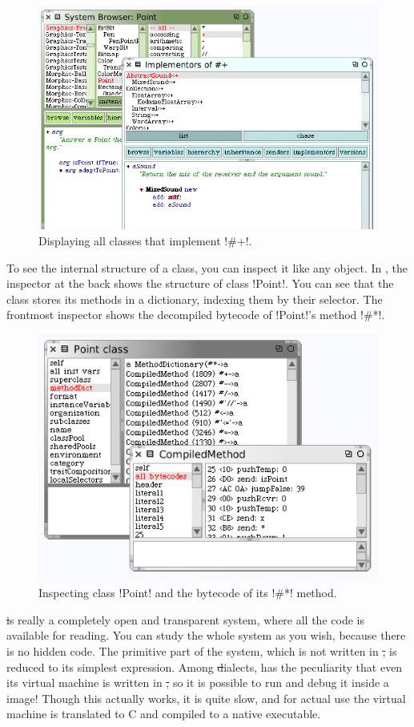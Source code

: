 \documentclass[a4paper,10pt,twoside]{book}
\begin{document}
\begin{figure}[ht]\centering
	\includegraphics[width=.75\linewidth]{implementors}
	\caption{Displaying all classes that implement \ct!\#+!.\label{fig:implementors}}
\end{figure}

To see the internal structure of a class, you can inspect it like any object.
In , the inspector at the back shows the structure of class \ct!Point!.
You can see that the class stores its methods in a dictionary, indexing them by their selector.
The frontmost inspector shows the decompiled bytecode of \ct!Point!'s method \ct!#*!.

\begin{figure}[ht]\centering
	\includegraphics[width=.75\linewidth]{CompiledMethod}
	\caption{Inspecting class \ct!Point! and the bytecode of its \ct!\#*! method.\label{fig:CompiledMethod}}
\end{figure}

\st is really a completely open and transparent system, where all the code is available for reading.
You can study the whole system as you wish, because there is no hidden code.
The primitive part of the system, \ie which is not written in \st, is reduced to its simplest expression.
Among \st dialects, \squeak has the peculiarity that even its virtual machine is written in \st, so it is possible to run and debug it inside a \squeak image!
Though this actually works, it is quite slow, and for actual use the virtual machine is translated to C and compiled to a native executable.
\end{document}

